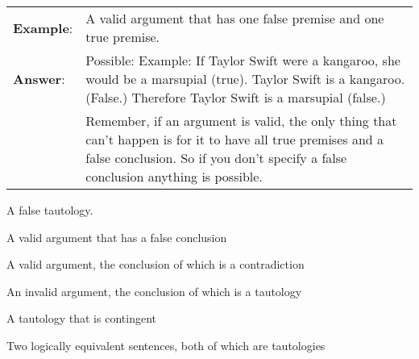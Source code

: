 \begin{longtabu}{p{.1\linewidth}p{.9\linewidth}}
\textbf{Example}: & A valid argument that has one false premise and one true premise.\\
\textbf{Answer}: & Possible: Example: If Taylor Swift were a kangaroo, she would be a marsupial (true). Taylor Swift is a kangaroo. (False.) Therefore Taylor Swift is a marsupial (false.)\\ &Remember, if an argument is valid, the only thing that can't happen is for it to have all true premises and a false conclusion. So if you don't specify a false conclusion anything is possible.\\
\end{longtabu}



\begin{exercises}
\item A false tautology.


\item A valid argument that has a false conclusion


\item A valid argument, the conclusion of which is a contradiction


\item An invalid argument, the conclusion of which is a tautology


\item A tautology that is contingent



\item Two logically equivalent sentences, both of which are tautologies


\end{exercises}
